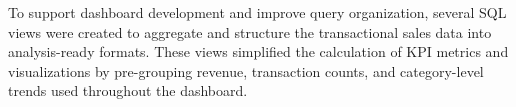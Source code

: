 To support dashboard development and improve query organization, several SQL views were created to aggregate and structure the transactional sales data into analysis-ready formats. These views simplified the calculation of KPI metrics and visualizations by pre-grouping revenue, transaction counts, and category-level trends used throughout the dashboard.

